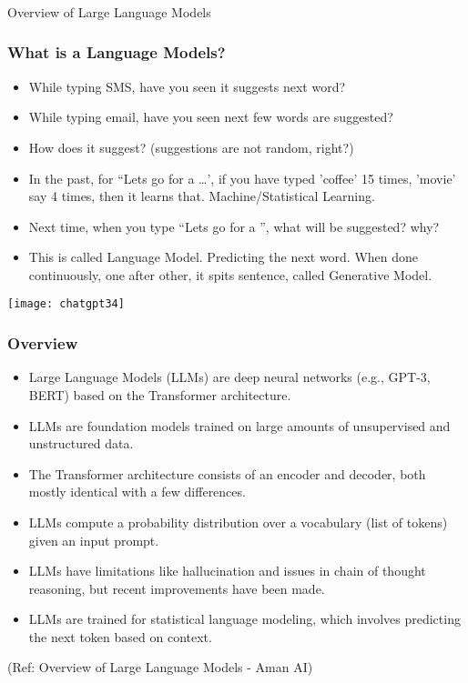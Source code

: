 \begin{frame}[fragile]\frametitle{}
\begin{center}
{\Large Overview of Large Language Models}
\end{center}
\end{frame}

\begin{frame}[fragile]\frametitle{What is a Language Models?}

\begin{itemize}
\item While typing SMS, have you seen it suggests next word?
\item While typing email, have you seen next few words are suggested?
\item How does it suggest? (suggestions are not random, right?)
\item In the past, for ``Lets go for a \ldots', if you have typed 'coffee' 15 times, 'movie' say 4 times, then it learns that. Machine/Statistical Learning.
\item Next time, when you type ``Lets go for a '', what will be suggested? why?
\item This is called Language Model. Predicting the next word. When done continuously, one after other, it spits sentence, called Generative Model.
\end{itemize}	

\begin{center}
\texttt{[image: chatgpt34]}
\end{center}		

\end{frame}

\begin{frame}[fragile]\frametitle{Overview}


\begin{itemize}
\item Large Language Models (LLMs) are deep neural networks (e.g., GPT-3, BERT) based on the Transformer architecture.
\item LLMs are foundation models trained on large amounts of unsupervised and unstructured data.
\item The Transformer architecture consists of an encoder and decoder, both mostly identical with a few differences.
\item LLMs compute a probability distribution over a vocabulary (list of tokens) given an input prompt.
\item LLMs have limitations like hallucination and issues in chain of thought reasoning, but recent improvements have been made.
\item LLMs are trained for statistical language modeling, which involves predicting the next token based on context.
\end{itemize}

				
{\tiny (Ref: Overview of Large Language Models - Aman AI)}

\end{frame}


